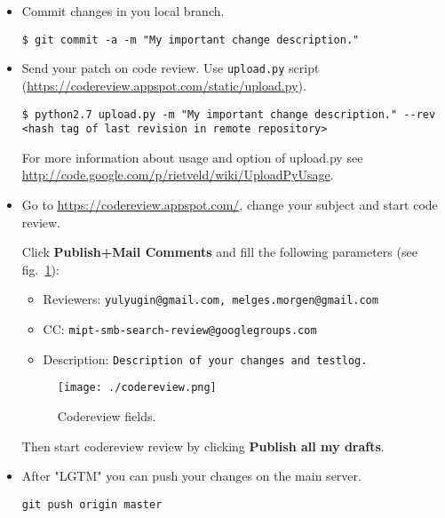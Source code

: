 \begin{itemize}

\item Commit changes in you local branch.

\begin{lstlisting}
$ git commit -a -m "My important change description."
\end{lstlisting}

\item Send your patch on code review. Use \texttt{upload.py} script (\url{https://codereview.appspot.com/static/upload.py}).

\begin{lstlisting}
$ python2.7 upload.py -m "My important change description." --rev <hash tag of last revision in remote repository>
\end{lstlisting}

For more information about usage and option of upload.py see \url{http://code.google.com/p/rietveld/wiki/UploadPyUsage}.

\item Go to \url{https://codereview.appspot.com/}, change your subject and start code review.

Click \textbf{Publish+Mail Comments} and fill the following parameters (see fig.~\ref{fig:codereview}):

\begin{itemize}
  \item Reviewers: \texttt{yulyugin@gmail.com, melges.morgen@gmail.com}
  \item CC: \texttt{mipt-smb-search-review@googlegroups.com}
  \item Description: \texttt{Description of your changes and testlog.}
\end{itemize}

\begin{figure}[htp]
  \centering
  \texttt{[image: ./codereview.png]}
  \caption{Codereview fields.}
  \label{fig:codereview}
\end{figure}

Then start codereview review by clicking \textbf{Publish all my drafts}.

\item After "LGTM" you can push your changes on the main server.

\begin{lstlisting}
git push origin master
\end{lstlisting}

\end{itemize}


